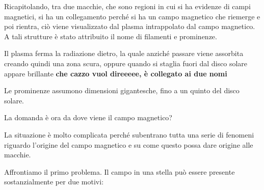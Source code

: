 Ricapitolando, tra due macchie, che sono regioni in cui si ha evidenze di campi magnetici, si ha un collegamento perché si ha un campo magnetico che riemerge e poi rientra, ciò viene visualizzato dal plasma intrappolato dal campo magnetico. A tali strutture è stato attribuito il nome di filamenti e prominenze.

Il plasma ferma la radiazione dietro, la quale anziché passare viene assorbita creando quindi una zona scura, oppure quando si staglia fuori dal disco solare appare brillante \textbf{che cazzo vuol direeeee, è collegato ai due nomi}

Le prominenze assumono dimensioni gigantesche, fino a un quinto del disco solare.

La domanda è ora da dove viene il campo magnetico?

La situazione è molto complicata perché subentrano tutta una serie di fenomeni riguardo l'origine del campo magnetico e su come questo possa dare origine alle macchie.

Affrontiamo il primo problema. Il campo in una stella può essere presente sostanzialmente per due motivi:

